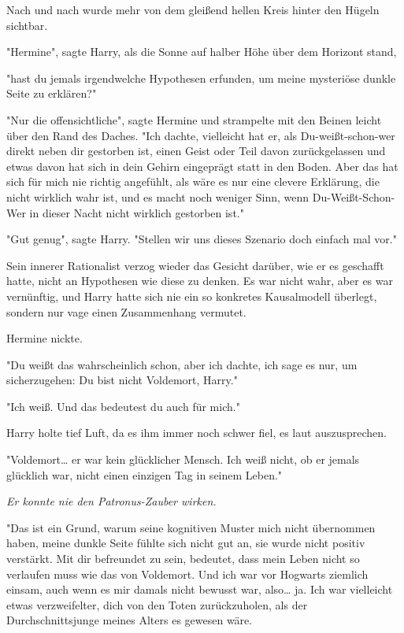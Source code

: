{Nach und nach wurde mehr von dem gleißend hellen Kreis hinter den Hügeln sichtbar.

"Hermine", sagte Harry, als die Sonne auf halber Höhe über dem Horizont stand,

"hast du jemals irgendwelche Hypothesen erfunden, um meine mysteriöse dunkle Seite zu erklären?"

"Nur die offensichtliche", sagte Hermine und strampelte mit den Beinen leicht über den Rand des Daches. "Ich dachte, vielleicht hat er, als Du-weißt-schon-wer direkt neben dir gestorben ist, einen Geist oder Teil davon zurückgelassen und etwas davon hat sich in dein Gehirn eingeprägt statt in den Boden. Aber das hat sich für mich nie richtig angefühlt, als wäre es nur eine clevere Erklärung, die nicht wirklich wahr ist, und es macht noch weniger Sinn, wenn Du-Weißt-Schon-Wer in dieser Nacht nicht wirklich gestorben ist."

"Gut genug", sagte Harry. "Stellen wir uns dieses Szenario doch einfach mal vor."

Sein innerer Rationalist verzog wieder das Gesicht darüber, wie er es geschafft hatte, nicht an Hypothesen wie diese zu denken. Es war nicht wahr, aber es war vernünftig, und Harry hatte sich nie ein so konkretes Kausalmodell überlegt, sondern nur vage einen Zusammenhang vermutet.

Hermine nickte.

"Du weißt das wahrscheinlich schon, aber ich dachte, ich sage es nur, um sicherzugehen: Du bist nicht Voldemort, Harry."

"Ich weiß. Und das bedeutest du auch für mich."

Harry holte tief Luft, da es ihm immer noch schwer fiel, es laut auszusprechen.

"Voldemort… er war kein glücklicher Mensch. Ich weiß nicht, ob er jemals glücklich war, nicht einen einzigen Tag in seinem Leben."

\emph{Er konnte nie den Patronus-Zauber wirken.}

"Das ist ein Grund, warum seine kognitiven Muster mich nicht übernommen haben, meine dunkle Seite fühlte sich nicht gut an, sie wurde nicht positiv verstärkt. Mit dir befreundet zu sein, bedeutet, dass mein Leben nicht so verlaufen muss wie das von Voldemort. Und ich war vor Hogwarts ziemlich einsam, auch wenn es mir damals nicht bewusst war, also… ja. Ich war vielleicht etwas verzweifelter, dich von den Toten zurückzuholen, als der Durchschnittsjunge meines Alters es gewesen wäre.

}

